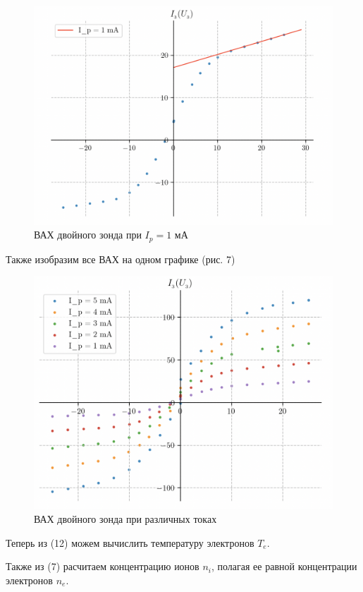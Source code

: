 \documentclass[12pt,a4paper]{article}
\begin{document}
\begin{figure}[H]
    \centering
    \includegraphics[width=0.4\linewidth]{1ma.png}
    \caption{ВАХ двойного зонда при $I_p = 1$ мА}
\end{figure}

Также изобразим все ВАХ на одном графике (рис. 7)

\begin{figure}[H]
    \centering
    \includegraphics[width=0.7\linewidth]{all_ma.png}
    \caption{ВАХ двойного зонда при различных токах}
\end{figure}


 

Теперь из (12) можем вычислить температуру электронов $T_e$.

Также из (7) расчитаем концентрацию ионов $n_i$, полагая ее равной концентрации электронов $n_e$.
\end{document}
